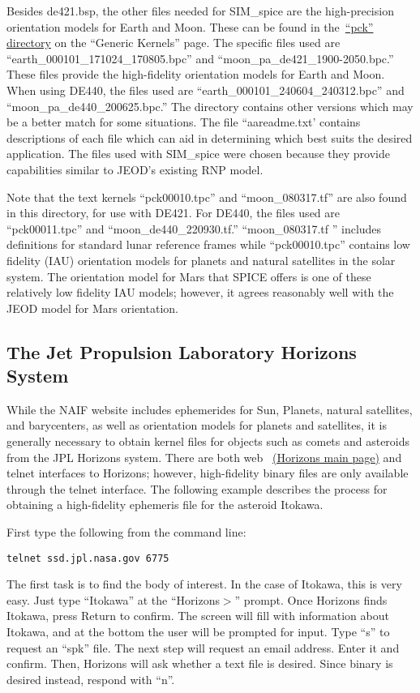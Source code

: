 Besides de421.bsp, the other files needed for SIM\_spice are the
high-precision orientation models for Earth and Moon.  These can be found in
the~\href{http://naif.jpl.nasa.gov/pub/naif/generic_kernels/pck}
{``pck'' directory} on the ``Generic Kernels'' page.  The specific files
used are ``earth\_000101\_171024\_170805.bpc'' and
``moon\_pa\_de421\_1900-2050.bpc.'' These files provide the high-fidelity
orientation models for Earth and Moon. When using DE440, the files used are
 ``earth\_000101\_240604\_240312.bpc'' and ``moon\_pa\_de440\_200625.bpc.''
The directory contains other versions which may be a better match for some
situations.  The file ``aareadme.txt' contains descriptions of each file which
can aid in determining which best suits the desired application. The files used
with SIM\_spice were chosen because they provide capabilities similar to JEOD's
existing RNP model.

Note that the text kernels
``pck00010.tpc'' and ``moon\_080317.tf'' are also found in this directory,
for use with DE421. For DE440, the files used are ``pck00011.tpc'' and
``moon\_de440\_220930.tf.'' ``moon\_080317.tf '' includes definitions for
standard lunar reference frames while ``pck00010.tpc'' contains
low fidelity (IAU) orientation models for planets and natural satellites in the
solar system. The orientation model for Mars that SPICE offers is one of these
relatively low fidelity IAU models; however, it agrees reasonably well with
the JEOD model for Mars orientation.


\subsection {The Jet Propulsion Laboratory Horizons System}
\label{subsec:horizons}
While the NAIF website includes ephemerides for Sun, Planets, natural
satellites, and barycenters, as well as orientation models for planets and
satellites, it is generally necessary to obtain kernel files for objects
such as comets and asteroids from the JPL Horizons system.  There are both
web ~\href{http://ssd.jpl.nasa.gov/?horizons}{(Horizons main page)} and telnet
interfaces to Horizons; however, high-fidelity binary files are only
available through the telnet interface.  The following example describes the
process for obtaining a high-fidelity ephemeris file for the asteroid Itokawa.

First type the following from the command line:
\begin{verbatim}
telnet ssd.jpl.nasa.gov 6775
\end{verbatim}
The first task is to find the body of interest. In the case of Itokawa, this
is very easy. Just type ``Itokawa'' at the ``Horizons$>$'' prompt. Once Horizons
finds Itokawa, press Return to confirm. The screen will fill with information
about Itokawa, and at the bottom the user will be prompted for input.  Type
``s'' to request an ``spk'' file.  The next step will request an email address.
Enter it and confirm.  Then, Horizons will ask whether a text file is desired.
Since binary is desired instead, respond with ``n''.

